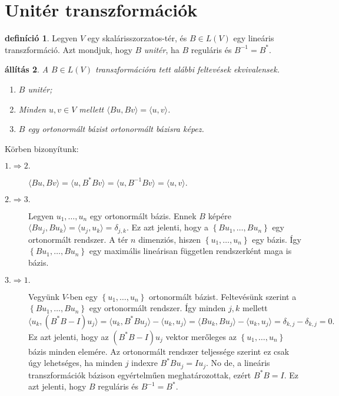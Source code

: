 \documentclass[a4paper, showtrims]{memoir}
\makeatletter
\renewenvironment{proof}[1][\proofname]
    {\par\pushQED{\qed}%
    \normalfont \topsep6\p@\@plus6\p@\relax
    \trivlist
    \item[\hskip\labelsep
        \itshape
    #1\@addpunct{:}]\ignorespaces}
    {\popQED\endtrivlist\@endpefalse}
\theoremstyle{plain}
\newtheorem{proposition}{állítás}[chapter]
\theoremstyle{remark}
\theoremstyle{definition}
\newtheorem{definition}[proposition]{definíció}
\newcommand{\ip}[2]{\langle#1,#2\rangle}
\makeatother
\begin{document}
\section{Unitér transzformációk}
\begin{definition}
	Legyen $V$ egy skalárisszorzatos-tér, és $B\in L\left( V \right)$ egy lineáris transzformáció.
	Azt mondjuk, hogy $B$
	\emph{unitér},
	ha $B$ reguláris és $B^{-1}=B^\ast$.
\end{definition}
\begin{proposition}
	A $B\in L\left( V \right)$ transzformációra tett alábbi feltevések ekvivalensek.
	\begin{enumerate}
		\item $B$ unitér;
		\item Minden $u,v\in V$ mellett $\ip{Bu}{Bv}=\ip{u}{v}$.
		\item $B$ egy ortonormált bázist ortonormált bázisra képez.
		      \qedhere
	\end{enumerate}
\end{proposition}
\begin{proof}
	Körben bizonyítunk:
	\begin{description}
		\item[$1.\Rightarrow 2.$]
		      \begin{math}
			      \ip{Bu}{Bv}
			      =
			      \ip{u}{B^\ast Bv}
			      =
			      \ip{u}{B^{-1}Bv}
			      =
			      \ip{u}{v}.
		      \end{math}
		\item[$2.\Rightarrow 3.$]
		      Legyen $u_1,\ldots,u_n$ egy ortonormált bázis.
		      Ennek $B$ képére
		      \begin{math}
			      \ip{Bu_j}{Bu_k}
			      =
			      \ip{u_j}{u_k}
			      =\delta_{j,k}.
		      \end{math}
		      Ez azt jelenti, hogy a $\left\{ Bu_1,\ldots,Bu_n \right\}$ egy ortonormált rendszer.
		      A tér $n$ dimenziós, hiszen $\left\{ u_1,\ldots,u_n \right\}$ egy bázis.
		      Így
		      $\left\{ Bu_1,\ldots,Bu_n \right\}$ egy maximális lineárisan független rendszerként maga is bázis.
		\item[$3.\Rightarrow 1.$]
		      Vegyünk $V$-ben egy $\left\{ u_1,\ldots,u_n \right\}$ ortonormált bázist.
		      Feltevésünk szerint a $\left\{ Bu_1,\ldots,Bu_n \right\}$ egy ortonormált rendszer.
		      Így minden $j,k$ mellett
		      \begin{displaymath}
			      \ip{u_k}{\left( B^\ast B-I \right)u_j}
			      =
			      \ip{u_k}{B^\ast Bu_j}-\ip{u_k}{u_j}
			      =
			      \ip{Bu_k}{Bu_j}-\ip{u_k}{u_j}
			      =
			      \delta_{k,j}-\delta_{k,j}
			      =
			      0.
		      \end{displaymath}
		      Ez azt jelenti, hogy az $(B^\ast B-I)u_j$ vektor merőleges az $\left\{ u_1,\ldots,u_n \right\}$ bázis minden elemére.
		      Az ortonormált rendszer teljessége szerint ez csak úgy lehetséges, ha minden $j$ indexre $B^\ast Bu_j=Iu_j$.
		      No de, a lineáris transzformációk bázison egyértelműen meghatározottak,
		      ezért $B^\ast B=I$.
		      Ez azt jelenti, hogy $B$ reguláris és $B^{-1}=B^\ast$.
	\end{description}
\end{proof}
\end{document}

